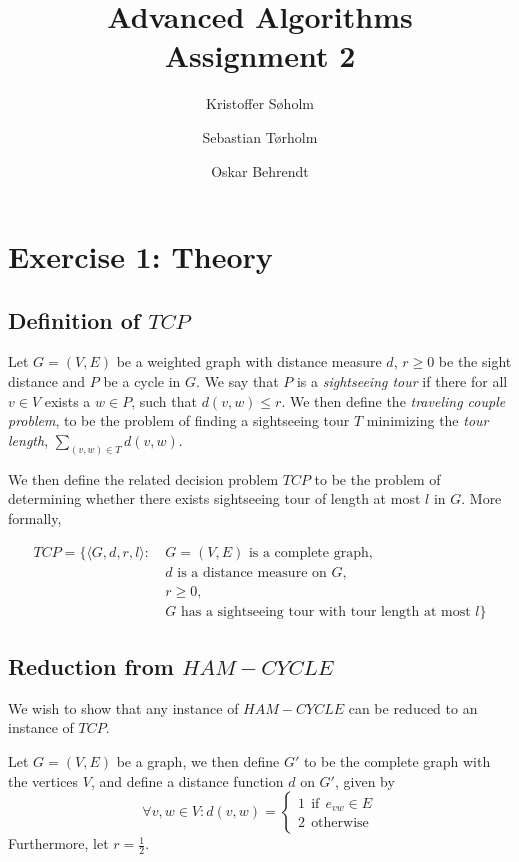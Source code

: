 \documentclass[11pt,a4paper]{article}
\title{Advanced Algorithms\\Assignment 2}
\author{Kristoffer Søholm \and Sebastian Tørholm \and Oskar Behrendt}
\begin{document}
\maketitle

\section{Exercise 1: Theory}
\subsection{Definition of $TCP$}
Let $G = (V, E)$ be a weighted graph with distance measure $d$,
$r \geq 0$ be the sight distance and $P$ be a cycle in $G$. We say
that $P$ is a \emph{sightseeing tour} if there for all $v \in V$ exists a
$w \in P$, such that $d(v, w) \leq r$. We then define the \emph{traveling
couple problem}, to be the problem of finding a sightseeing tour $T$ minimizing
the \emph{tour length}, $\sum_{(v,w) \in T} d(v, w)$.

We then define the related decision problem $TCP$ to be the problem of determining
whether there exists sightseeing tour of length at most $l$ in $G$. More formally,

\begin{align*}
    TCP = \{ \langle G, d, r, l \rangle :\ & G = (V,E) \text{ is a complete graph}, \\
                                           & d \text{ is a distance measure on } G, \\
                                           & r \geq 0, \\
                                           & G \text{ has a sightseeing tour with tour length at most } l \}
\end{align*}

\subsection{Reduction from $HAM-CYCLE$}
We wish to show that any instance of $HAM-CYCLE$ can be reduced to an instance of $TCP$.

Let $G = (V, E)$ be a graph, we then define $G'$ to be the complete graph with
the vertices $V$, and define a distance function $d$ on $G'$, given by
\[
    \forall v, w \in V : d(v, w) = \begin{cases} 1\ \ \text{if}\ \ e_{vw} \in E \\
                                                 2\ \ \text{otherwise}
                                   \end{cases} 
\]
Furthermore, let $r = \frac{1}{2}$.
\end{document}
